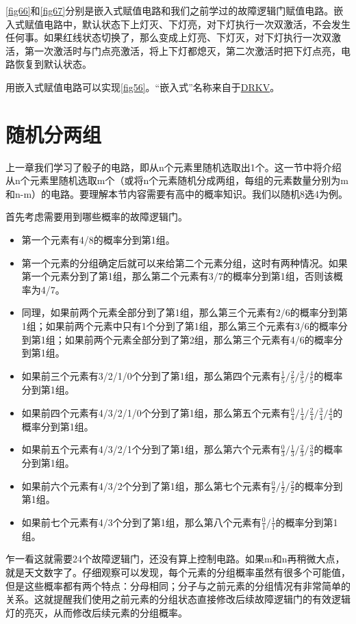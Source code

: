 \autoref{fig66}和\autoref{fig67}分别是嵌入式赋值电路和我们之前学过的故障逻辑门赋值电路。嵌入式赋值电路中，默认状态下上灯灭、下灯亮，对下灯执行一次双激活，不会发生任何事。如果红线状态切换了，那么变成上灯亮、下灯灭，对下灯执行一次双激活，第一次激活时与门点亮激活，将上下灯都熄灭，第二次激活时把下灯点亮，电路恢复到默认状态。

用嵌入式赋值电路可以实现\autoref{fig56}。“嵌入式”名称来自于\href{https://forums.terraria.org/index.php?threads/a-reference-guide-for-simple-logic-devices.81751/}{DRKV}。

\section{随机分两组}\label{sec36}

上一章我们学习了骰子的电路，即从n个元素里随机选取出1个。这一节中将介绍从n个元素里随机选取m个（或将n个元素随机分成两组，每组的元素数量分别为m和n-m）的电路。要理解本节内容需要有高中的概率知识。我们以随机8选4为例。

首先考虑需要用到哪些概率的故障逻辑门。
\begin{itemize}
\item 第一个元素有4/8的概率分到第1组。
\item 第一个元素的分组确定后就可以来给第二个元素分组，这时有两种情况。如果第一个元素分到了第1组，那么第二个元素有3/7的概率分到第1组，否则该概率为4/7。
\item 同理，如果前两个元素全部分到了第1组，那么第三个元素有2/6的概率分到第1组；如果前两个元素中只有1个分到了第1组，那么第三个元素有3/6的概率分到第1组；如果前两个元素全部分到了第2组，那么第三个元素有4/6的概率分到第1组。
\item 如果前三个元素有3/2/1/0个分到了第1组，那么第四个元素有$\frac{1}{5}/\frac{2}{5}/\frac{3}{5}/\frac{4}{5}$的概率分到第1组。
\item 如果前四个元素有4/3/2/1/0个分到了第1组，那么第五个元素有$\frac{0}{4}/\frac{1}{4}/\frac{2}{4}/\frac{3}{4}/\frac{4}{4}$的概率分到第1组。
\item 如果前五个元素有4/3/2/1个分到了第1组，那么第六个元素有$\frac{0}{3}/\frac{1}{3}/\frac{2}{3}/\frac{3}{3}$的概率分到第1组。
\item 如果前六个元素有4/3/2个分到了第1组，那么第七个元素有$\frac{0}{2}/\frac{1}{2}/\frac{2}{2}$的概率分到第1组。
\item 如果前七个元素有4/3个分到了第1组，那么第八个元素有$\frac{0}{1}/\frac{1}{1}$的概率分到第1组。
\end{itemize}

乍一看这就需要24个故障逻辑门，还没有算上控制电路。如果m和n再稍微大点，就是天文数字了。仔细观察可以发现，每个元素的分组概率虽然有很多个可能值，但是这些概率都有两个特点：分母相同；分子与之前元素的分组情况有非常简单的关系。这就提醒我们使用之前元素的分组状态直接修改后续故障逻辑门的有效逻辑灯的亮灭，从而修改后续元素的分组概率。

